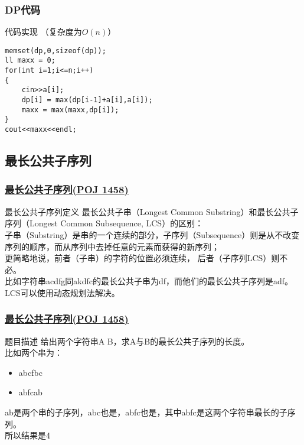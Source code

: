 \documentclass{beamer}
\begin{document}
\begin{frame}[fragile]
\frametitle{DP代码}

\begin{block}{代码实现  （复杂度为$O(n)$）}
	\begin{lstlisting}
memset(dp,0,sizeof(dp));
ll maxx = 0;
for(int i=1;i<=n;i++)
{
    cin>>a[i];
    dp[i] = max(dp[i-1]+a[i],a[i]);
    maxx = max(maxx,dp[i]);
}
cout<<maxx<<endl;
	\end{lstlisting}
\end{block}
\end{frame}



\subsection{最长公共子序列}

\begin{frame}
\frametitle{\href{http://poj.org/problem?id=1458}{最长公共子序列(POJ 1458)}}
\begin{block}{最长公共子序列定义}
	最长公共子串（Longest Common Substring）和最长公共子序列（Longest Common Subsequence, LCS）的区别：\\
	子串（Substring）是串的一个连续的部分，子序列（Subsequence）则是从不改变序列的顺序，而从序列中去掉任意的元素而获得的新序列；\\
	更简略地说，前者（子串）的字符的位置必须连续，	后者（子序列LCS）则不必。\\
	比如字符串acdfg同akdfc的最长公共子串为df，而他们的最长公共子序列是adf。LCS可以使用动态规划法解决。
\end{block}	

\end{frame}

\begin{frame}[fragile]
\frametitle{\href{http://poj.org/problem?id=1458}{最长公共子序列(POJ 1458)}}
\begin{block}{题目描述}
	给出两个字符串A B，求A与B的最长公共子序列的长度。\\
	比如两个串为：\\
	\begin{itemize}
		\item abcfbc         
		\item abfcab
	\end{itemize}
	ab是两个串的子序列，abc也是，abfc也是，其中abfc是这两个字符串最长的子序列。\\
	所以结果是4
\end{block}
\end{frame}
\end{document}
